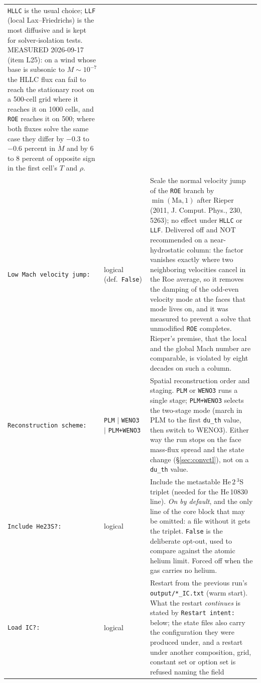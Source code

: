 \documentclass[english,a4paper]{my_memo}
\begin{document}
\begin{longtable}{@{}p{}p{}p{}@{}}
  \texttt{HLLC} is the usual choice; \texttt{LLF} (local Lax--Friedrichs) is
  the most diffusive and is kept for solver-isolation tests. MEASURED
  2026-09-17 (item L25): on a wind whose base is subsonic to $M\sim10^{-7}$
  the HLLC flux can fail to reach the stationary root on a 500-cell grid where
  it reaches it on 1000 cells, and \texttt{ROE} reaches it on 500; where both
  fluxes solve the same case they differ by $-0.3$ to $-0.6$ percent in
  $\dot M$ and by 6 to 8 percent of opposite sign in the first cell's $T$ and
  $\rho$. \\
\texttt{Low Mach velocity jump:} & logical (def.\ \texttt{False}) &
  Scale the normal velocity jump of the \texttt{ROE} branch by
  $\min(\mathrm{Ma},1)$ after Rieper (2011, J. Comput. Phys., 230, 5263);
  no effect under
  \texttt{HLLC} or \texttt{LLF}. Delivered off and NOT recommended on a
  near-hydrostatic column: the factor vanishes exactly where two neighboring
  velocities cancel in the Roe average, so it removes the damping of the
  odd-even velocity mode at the faces that mode lives on, and it was measured
  to prevent a solve that unmodified \texttt{ROE} completes. Rieper's premise,
  that the local and the global Mach number are comparable, is violated by
  eight decades on such a column. \\
\texttt{Reconstruction scheme:} & \texttt{PLM} $|$ \texttt{WENO3} $|$
  \texttt{PLM+WENO3} & Spatial reconstruction order and staging.
  \texttt{PLM} or \texttt{WENO3} runs a single stage;
  \texttt{PLM+WENO3} selects the two-stage mode (march in PLM to the first
  \texttt{du\_th} value, then switch to WENO3). Either way the run stops on the
  face mass-flux spread and the state change (\S\ref{sec:convctl}), not on a
  \texttt{du\_th} value. \\
\texttt{Include He23S?:} & logical & Include the metastable He\,$2\,^3$S triplet
  (needed for the He\,10830 line). \emph{On by default}, and the only line of
  the core block that may be omitted: a file without it gets the triplet.
  \texttt{False} is the deliberate opt-out, used to compare against the atomic
  helium limit. Forced off when the gas carries no helium. \\
\texttt{Load IC?:} & logical & Restart from the previous run's
  \texttt{output/*\_IC.txt} (warm start). What the restart \emph{continues}
  is stated by \texttt{Restart intent:} below; the state files also carry the
  configuration they were produced under, and a restart under another
  composition, grid, constant set or option set is refused naming the field

\end{longtable}
\end{document}
